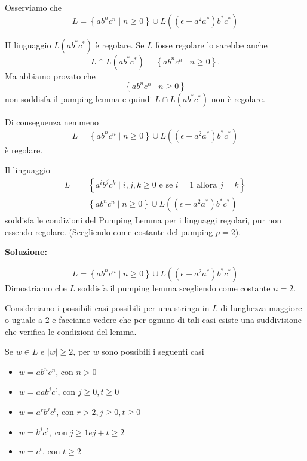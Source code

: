 Osserviamo che
$$
L=\left\{a b^{n} c^{n} \mid n \geq 0\right\} \cup L\left(\left(\epsilon+a^{2} a^{*}\right) b^{*} c^{*}\right)
$$

\vspace{5mm}

II linguaggio $L\left(a b^{*} c^{*}\right)$ è regolare. Se $L$ fosse regolare lo sarebbe anche
$$
L \cap L\left(a b^{*} c^{*}\right)=\left\{a b^{n} c^{n} \mid n \geq 0\right\} .
$$
Ma abbiamo provato che
$$
\left\{a b^{n} c^{n} \mid n \geq 0\right\}
$$
non soddisfa il pumping lemma e quindi $L \cap L\left(a b^{*} c^{*}\right)$ non è regolare.

Di conseguenza nemmeno
$$
L=\left\{a b^{n} c^{n} \mid n \geq 0\right\} \cup L\left(\left(\epsilon+a^{2} a^{*}\right) b^{*} c^{*}\right)
$$
è regolare.

\vspace{5mm}

Il linguaggio
$$
\begin{aligned}
L &=\left\{a^{i} b^{j} c^{k} \mid i, j, k \geq 0 \text { e se } i=1 \text { allora } j=k\right\} \\
&=\left\{a b^{n} c^{n} \mid n \geq 0\right\} \cup L\left(\left(\epsilon+a^{2} a^{*}\right) b^{*} c^{*}\right)
\end{aligned}
$$
soddisfa le condizioni del Pumping Lemma per i linguaggi regolari, pur non essendo regolare. (Scegliendo come costante del pumping $p=2)$.

\vspace{5mm}

\textbf{Soluzione:}

$$
L=\left\{a b^{n} c^{n} \mid n \geq 0\right\} \cup L\left(\left(\epsilon+a^{2} a^{*}\right) b^{*} c^{*}\right)
$$
Dimostriamo che $L$ soddisfa il pumping lemma scegliendo come costante $n=2$.

Consideriamo i possibili casi possibili per una stringa in $L$ di lunghezza maggiore o uguale a 2 e facciamo vedere che per ognuno di tali casi esiste una suddivisione che verifica le condizioni del lemma.

Se $w \in L$ e $|w| \geq 2$, per $w$ sono possibili i seguenti casi
\begin{itemize}
    \item $w=a b^{n} c^{n}$, con $n>0$
    \item $w=a a b^{j} c^{t}$, con $j \geq 0, t \geq 0$
    \item $w=a^{r} b^{j} c^{t}$, con $r>2, j \geq 0, t \geq 0$
    \item $w=b^{j} c^{t}, \operatorname{con} j \geq 1 e j+t \geq 2$
    \item $w=c^{t}$, con $t \geq 2$
\end{itemize}

